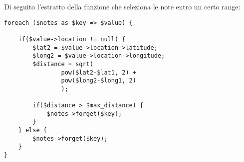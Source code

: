 Di seguito l'estratto della funzione che seleziona le note entro un certo range:
\begin{lstlisting}
foreach ($notes as $key => $value) {

	if($value->location != null) {
		$lat2 = $value->location->latitude;
		$long2 = $value->location->longitude;
		$distance = sqrt(
				pow($lat2-$lat1, 2) +
			 	pow($long2-$long1, 2)
			 	);

		if($distance > $max_distance) {
			$notes->forget($key);
		}    
	} else {
		$notes->forget($key);
	}
}
\end{lstlisting}


